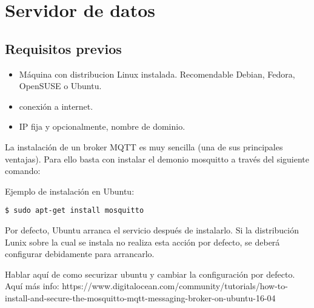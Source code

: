 \section{Servidor de datos}
\label{makereference5.2}
\subsection{Requisitos previos}
\begin{itemize}
\item Máquina con distribucion Linux instalada. Recomendable Debian, Fedora, OpenSUSE o Ubuntu.
\item conexión a internet.
\item IP fija y opcionalmente, nombre de dominio.
\end{itemize}

La instalación de un broker MQTT es muy sencilla (una de sus principales ventajas). Para ello basta con instalar el demonio mosquitto a través del siguiente comando:

Ejemplo de instalación en Ubuntu:
\lstset{language=bash}
\begin{lstlisting}[frame=single]
$ sudo apt-get install mosquitto
\end{lstlisting}

Por defecto, Ubuntu arranca el servicio después de instalarlo. Si la distribución Lunix sobre la cual se instala no realiza esta acción por defecto, se deberá configurar debidamente para arrancarlo.

Hablar aquí de como securizar ubuntu y cambiar la configuración por defecto.
Aquí más info: https://www.digitalocean.com/community/tutorials/how-to-install-and-secure-the-mosquitto-mqtt-messaging-broker-on-ubuntu-16-04